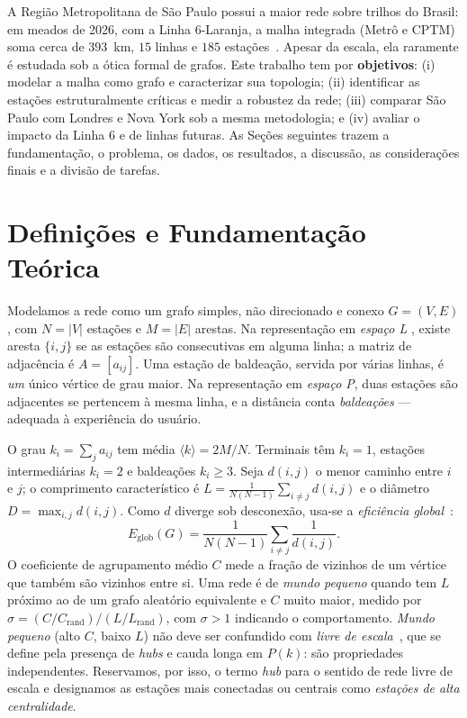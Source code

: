 \documentclass[12pt]{article}
\begin{document}
A Região Metropolitana de São Paulo possui a maior rede sobre trilhos do Brasil:
em meados de 2026, com a Linha 6-Laranja, a malha integrada (Metrô e CPTM) soma
cerca de $393$~km, $15$ linhas e $185$ estações~\cite{metrosp2026,cptm2026}.
Apesar da escala, ela raramente é estudada sob a ótica formal de grafos. Este
trabalho tem por \textbf{objetivos}: (i) modelar a malha como grafo e
caracterizar sua topologia; (ii) identificar as estações estruturalmente
críticas e medir a robustez da rede; (iii) comparar São Paulo com Londres e Nova
York sob a mesma metodologia; e (iv) avaliar o impacto da Linha 6 e de linhas
futuras. As Seções seguintes trazem a fundamentação, o problema, os dados, os
resultados, a discussão, as considerações finais e a divisão de tarefas.

\section{Definições e Fundamentação Teórica}

Modelamos a rede como um grafo simples, não direcionado e conexo $G=(V,E)$, com
$N=|V|$ estações e $M=|E|$ arestas. Na representação em \emph{espaço L}
\cite{vonferber2009}, existe aresta $\{i,j\}$ se as estações são consecutivas em
alguma linha; a matriz de adjacência é $A=[a_{ij}]$. Uma estação de baldeação,
servida por várias linhas, é \emph{um} único vértice de grau maior. Na
representação em \emph{espaço P}, duas estações são adjacentes se pertencem à
mesma linha, e a distância conta \emph{baldeações} --- adequada à experiência do
usuário.

O grau $k_i=\sum_j a_{ij}$ tem média $\langle k\rangle = 2M/N$. Terminais têm
$k_i=1$, estações intermediárias $k_i=2$ e baldeações $k_i\geq 3$. Seja $d(i,j)$
o menor caminho entre $i$ e $j$; o comprimento característico é
$L=\tfrac{1}{N(N-1)}\sum_{i\neq j} d(i,j)$ e o diâmetro $D=\max_{i,j} d(i,j)$. Como
$d$ diverge sob desconexão, usa-se a \emph{eficiência global}~\cite{latora2001}:
\begin{equation}
  E_{\mathrm{glob}}(G)=\frac{1}{N(N-1)}\sum_{i\neq j}\frac{1}{d(i,j)}.
\end{equation}
O coeficiente de agrupamento médio $C$ mede a fração de vizinhos de um vértice
que também são vizinhos entre si. Uma rede é de \emph{mundo pequeno}
\cite{watts1998} quando tem $L$ próximo ao de um grafo aleatório equivalente e
$C$ muito maior, medido por $\sigma=(C/C_{\mathrm{rand}})/(L/L_{\mathrm{rand}})$,
com $\sigma>1$ indicando o comportamento. \emph{Mundo pequeno} (alto $C$, baixo
$L$) não deve ser confundido com \emph{livre de escala}~\cite{barabasi1999}, que
se define pela presença de \emph{hubs} e cauda longa em $P(k)$: são propriedades
independentes. Reservamos, por isso, o termo \emph{hub} para o sentido de rede
livre de escala e designamos as estações mais conectadas ou centrais como
\emph{estações de alta centralidade}.
\end{document}
